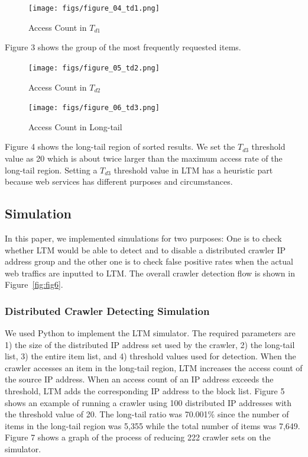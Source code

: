 \documentclass[sigconf,review]{acmart}
\begin{document}
\begin{figure}[H]
    \centering
    \texttt{[image: figs/figure\_04\_td1.png]}
    \caption{Access Count in $T_{d1}$}
    \label{fig:fig3}
\end{figure}

Figure 3 shows the group of the most frequently requested items. 

\begin{figure}[H]
    \centering
    \texttt{[image: figs/figure\_05\_td2.png]}
    \caption{Access Count in $T_{d2}$}
    \label{fig:fig4}
\end{figure}

\begin{figure}[H]
    \centering
    \texttt{[image: figs/figure\_06\_td3.png]}
    \caption{Access Count in Long-tail}
    \label{fig:fig5}
\end{figure}

Figure 4 shows the long-tail region of sorted results. We set the $T_{d3}$ threshold value as 20 which is about twice larger than the maximum access rate of the long-tail region. Setting a $T_{d3}$ threshold value in LTM has a heuristic part because web services has different purposes and circumstances.

\subsection{Simulation}
In this paper, we implemented simulations for two purposes: One is to check whether LTM would be able to detect and to disable a distributed crawler IP address group and the other one is to check false positive rates when the actual web traffics are inputted to LTM. The overall crawler detection flow is shown in Figure~\ref{fig:fig6}.

\subsubsection {Distributed Crawler Detecting Simulation}

We used Python to implement the LTM simulator. The required parameters are 1) the size of the distributed IP address set used by the crawler, 2) the long-tail list, 3) the entire item list, and 4) threshold values used for detection.
When the crawler accesses an item in the long-tail region, LTM increases the access count of the source IP address. When an access count of an IP address exceeds the threshold, LTM adds the corresponding IP address to the block list. Figure 5 shows an example of running a crawler using 100 distributed IP addresses with the threshold value of 20. The long-tail ratio was 70.001\% since the number of items in the long-tail region was 5,355 while the total number of items was 7,649. Figure 7 shows a graph of the process of reducing 222 crawler sets on the simulator. 
\end{document}
